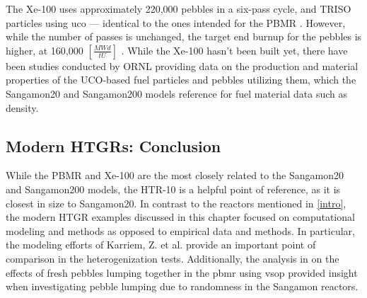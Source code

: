The Xe-100 uses approximately 220,000 pebbles in a six-pass cycle, and TRISO particles using \acrfull{uco} --- identical to the ones intended for the PBMR \cite{harlan_x-energy_2018}.  However, while the number of passes is unchanged, the target end burnup for the pebbles is higher, at 160,000 $\left[\frac{MWd}{tU}\right]$ \cite{agnihotri_intrinsically_2017}.  While the Xe-100 hasn't been built yet, there have been studies conducted by ORNL providing data on the production and material properties of the UCO-based fuel particles \cite{helmreich_year_2017} and pebbles utilizing them, which the Sangamon20 and Sangamon200 models reference for fuel material data such as density.

\subsection{Modern HTGRs: Conclusion}

While the PBMR and Xe-100 are the most closely related to the Sangamon20 and Sangamon200 models, the HTR-10 is a helpful point of reference, as it is closest in size to Sangamon20.  In contrast to the reactors mentioned in \autoref{intro}, the modern HTGR examples discussed in this chapter focused on computational modeling and methods as opposed to empirical data and methods.  In particular, the modeling efforts of Karriem, Z. et al. \cite{karriem_mcnp_2001} provide an important point of comparison in the heterogenization tests.  Additionally, the analysis in \cite{reitsma_investigation_2005} on the effects of fresh pebbles lumping together in the \acrshort{pbmr} using \acrshort{vsop} provided insight when investigating pebble lumping due to randomness in the Sangamon reactors.